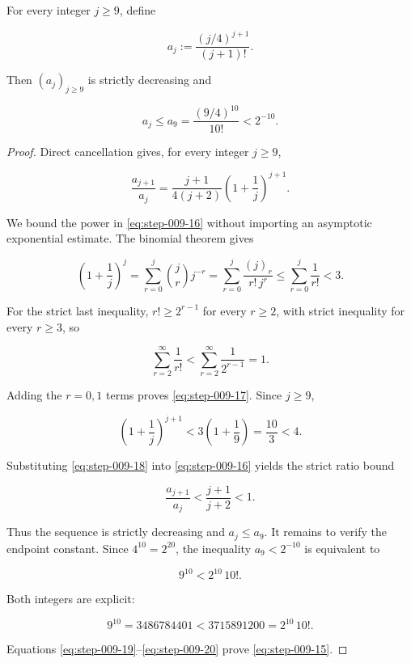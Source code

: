 \begin{lemma}\label{lem:step-009-envelope}
For every integer \(j\ge9\), define

\[
a_j:=\frac{(j/4)^{j+1}}{(j+1)!}.
\tag{S9.14}\label{eq:step-009-14}
\]

Then \((a_j)_{j\ge9}\) is strictly decreasing and

\[
a_j\le a_9
=\frac{(9/4)^{10}}{10!}
<2^{-10}.
\tag{S9.15}\label{eq:step-009-15}
\]
\end{lemma}

\begin{proof}
Direct cancellation gives, for every integer \(j\ge9\),

\[
\frac{a_{j+1}}{a_j}
=\frac{j+1}{4(j+2)}
 \left(1+\frac1j\right)^{j+1}.
\tag{S9.16}\label{eq:step-009-16}
\]

We bound the power in \eqref{eq:step-009-16} without importing an asymptotic exponential
estimate. The binomial theorem gives

\[
\left(1+\frac1j\right)^j
=\sum_{r=0}^j \binom jr j^{-r}
=\sum_{r=0}^j \frac{(j)_r}{r!\,j^r}
\le\sum_{r=0}^j\frac1{r!}
<3.
\tag{S9.17}\label{eq:step-009-17}
\]

For the strict last inequality, \(r!\ge2^{r-1}\) for every \(r\ge2\),
with strict inequality for every \(r\ge3\), so

\[
\sum_{r=2}^{\infty}\frac1{r!}
<\sum_{r=2}^{\infty}\frac1{2^{r-1}}=1.
\]

Adding the \(r=0,1\) terms proves \eqref{eq:step-009-17}. Since \(j\ge9\),

\[
\left(1+\frac1j\right)^{j+1}
<3\left(1+\frac19\right)
=\frac{10}{3}<4.
\tag{S9.18}\label{eq:step-009-18}
\]

Substituting \eqref{eq:step-009-18} into \eqref{eq:step-009-16} yields the strict ratio bound

\[
\frac{a_{j+1}}{a_j}
<\frac{j+1}{j+2}<1.
\tag{S9.19}\label{eq:step-009-19}
\]

Thus the sequence is strictly decreasing and \(a_j\le a_9\). It remains
to verify the endpoint constant. Since \(4^{10}=2^{20}\), the inequality
\(a_9<2^{-10}\) is equivalent to

\[
9^{10}<2^{10}\,10!.
\]

Both integers are explicit:

\[
9^{10}=3486784401
<3715891200=2^{10}\,10!.
\tag{S9.20}\label{eq:step-009-20}
\]

Equations \eqref{eq:step-009-19}--\eqref{eq:step-009-20} prove \eqref{eq:step-009-15}. \end{proof}

